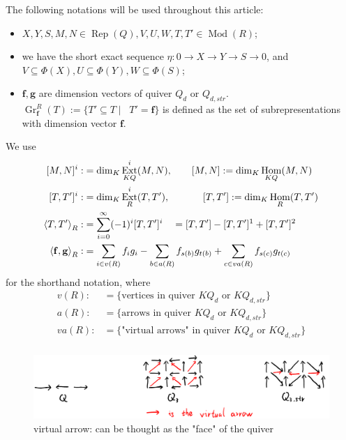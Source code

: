 \documentclass[reqno,11pt]{amsart}
\numberwithin{equation}{section}
\theoremstyle{plain}
\theoremstyle{plain}
\numberwithin{equation}{section}
\theoremstyle{remark}
\DeclareMathOperator{\Rep}{\operatorname{Rep}}
\DeclareMathOperator{\Mod}{\operatorname{Mod}}
\DeclareMathOperator{\Hom}{\operatorname{Hom}}
\DeclareMathOperator{\Ext}{\operatorname{Ext}}
\DeclareMathOperator{\dimv}{\operatorname{\underline{\mathbf{dim}}}}
\newcommand{\Grr}{\operatorname{Gr}^{R}}
\newcommand{\dimvec}[1]{\mathbf{#1}}
\begin{document}
   The following notations will be used throughout this article:
   \begin{itemize}
   		\item $X,Y,S,M,N \in \Rep(Q), V,U,W,T,T' \in \Mod(R)$;
   		\item we have the short exact sequence $\eta:0\longrightarrow X \longrightarrow Y \longrightarrow S \longrightarrow 0$, and $V \subseteq \Phi(X), U \subseteq \Phi(Y), W \subseteq \Phi(S)$;
   		\item $\dimvec{f},\dimvec{g}$ are dimension vectors of quiver $Q_d$ or $Q_{d,str}$. $\Grr_{\dimvec{f}}(T):= \{ T' \subseteq T \mid \dimv T'=\dimvec{f} \}$ is defined as the set of subrepresentations with dimension vector $\dimvec{f}$.
   \end{itemize}
We use 
\begin{equation*}
\begin{aligned}[]
	[M,N]^i:&=\dim_K \Ext^i_{KQ} (M,N),\qquad [M,N]:=\dim_K \Hom_{KQ} (M,N)\\
	[T,T']^i:&=\dim_K \Ext^i_R (T,T'),\qquad\hspace{0.5cm} [T,T']:=\dim_K \Hom_R (T,T')\\
	\left< T,T'\right>_R:&= \sum_{i=0}^{\infty} (-1)^i [T,T']^i \quad=[T,T']-[T,T']^1+[T,T']^2\\
	\left< \dimvec{f},\dimvec{g}\right>_R:&= \sum_{i \in v(R)} f_ig_i - \sum_{b \in a(R)} f_{s(b)}g_{t(b)}+ \sum_{c \in va(R)} f_{s(c)}g_{t(c)}
\end{aligned}
\end{equation*}
for the shorthand notation, where
\begin{equation*}
\begin{aligned}
	v(R):&= \{\text{vertices in quiver $KQ_d$ or $KQ_{d,str}$}\} \\
	a(R):&= \{\text{arrows in quiver $KQ_d$ or $KQ_{d,str}$}\} \\
	va(R):&= \{\text{"virtual arrows" in quiver $KQ_d$ or $KQ_{d,str}$}\} \\
\end{aligned}
\end{equation*}

\begin{center}
	\begin{figure}[ht]\label{fig:virtualarrow}
		\vspace{0cm}
		\centering
		\includegraphics[width=15cm]{figures/virtualarrow.png}
		\caption{virtual arrow: can be thought as the "face" of the quiver}
	\end{figure}
\end{center}
\end{document}
